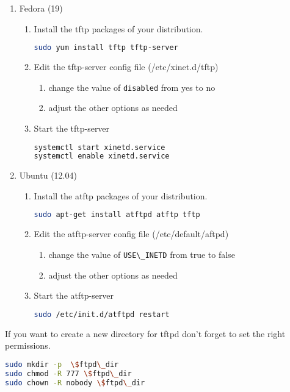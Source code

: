 \begin{enumerate}
\item Fedora (19)
  \begin{enumerate}
  \item Install the tftp packages of your distribution.
    \begin{lstlisting}[language=sh]
sudo yum install tftp tftp-server
    \end{lstlisting}
  \item Edit the tftp-server config file (/etc/xinet.d/tftp)
    \begin{enumerate}
      \item change the value of \lstinline[language=sh]{disabled} from yes to no
      \item adjust the other options as needed
    \end{enumerate}
  \item Start the tftp-server
    \begin{lstlisting}[language=sh]
systemctl start xinetd.service
systemctl enable xinetd.service
    \end{lstlisting}
  \end{enumerate}
\item Ubuntu (12.04)
  \begin{enumerate}
  \item Install the atftp packages of your distribution.
    \begin{lstlisting}[language=sh]
sudo apt-get install atftpd atftp tftp
    \end{lstlisting}
  \item Edit the atftp-server config file (/etc/default/aftpd)
    \begin{enumerate}
      \item change the value of \lstinline[language=sh]{USE\_INETD} from true to false
      \item adjust the other options as needed
    \end{enumerate}
  \item Start the atftp-server
    \begin{lstlisting}[language=sh]
sudo /etc/init.d/atftpd restart
    \end{lstlisting}
  \end{enumerate}
\end{enumerate}

If you want to create a new directory for tftpd don't forget to set the right permissions.
\begin{lstlisting}[language=sh]
sudo mkdir -p  \$ftpd\_dir
sudo chmod -R 777 \$ftpd\_dir
sudo chown -R nobody \$ftpd\_dir
\end{lstlisting}

